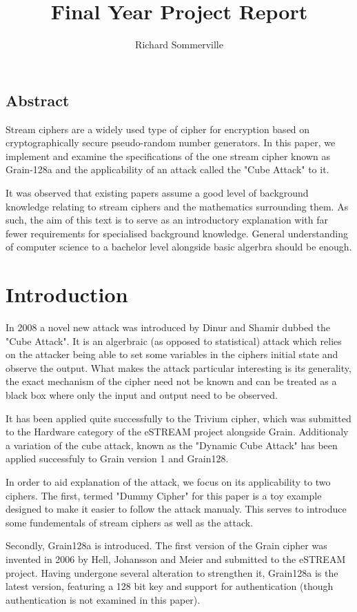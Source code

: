 \documentclass{report}
\title{Final Year Project Report}
\author{Richard Sommerville}
\date{}
\begin{document}
\maketitle
\tableofcontents
\section{Abstract}
Stream ciphers are a widely used type of cipher for encryption based on cryptographically secure pseudo-random number generators. In this paper, we  implement and examine the specifications of the one stream cipher known as Grain-128a and the applicability of an attack called the "Cube Attack" to it.

It was observed that existing papers assume a good level of background knowledge relating to stream ciphers and the mathematics surrounding them. As such, the aim of this text is to serve as an introductory explanation with far fewer requirements for specialised background knowledge. General understanding of computer science to a bachelor level alongside basic algerbra should be enough.
\chapter{Introduction}
In 2008 a novel new attack was introduced by Dinur and Shamir\cite{DinurShamir2009} dubbed the "Cube Attack". It is an algerbraic (as opposed to statistical) attack which relies on the attacker being able to set some variables in the ciphers initial state and observe the output. What makes the attack particular interesting is its generality, the exact mechanism of the cipher need not be known and can be treated as a black box where only the input and output need to be observed.

It has been applied quite successfully to the Trivium cipher, which was submitted to the Hardware category of the eSTREAM project alongside Grain\cite{Grain128aSpec}. Additionaly a variation of the cube attack, known as the "Dynamic Cube Attack" has been applied successfuly to Grain version 1 and Grain128.

In order to aid explanation of the attack, we focus on its applicability to two ciphers. The first, termed "Dummy Cipher" for this paper is a toy example designed to make it easier to follow the attack manualy. This serves to introduce some fundementals of stream ciphers as well as the attack.

Secondly, Grain128a is introduced. The first version of the Grain cipher was invented in 2006 by Hell, Johansson and Meier \cite{Grain128aSpec} and submitted to the eSTREAM project. Having undergone several alteration to strengthen it, Grain128a is the latest version, featuring a 128 bit key and support for authentication (though authentication is not examined in this paper).
\end{document}
